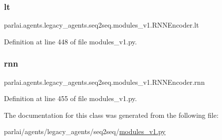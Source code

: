 \subsubsection{\texorpdfstring{lt}{lt}}
{\footnotesize\ttfamily parlai.\+agents.\+legacy\+\_\+agents.\+seq2seq.\+modules\+\_\+v1.\+R\+N\+N\+Encoder.\+lt}



Definition at line 448 of file modules\+\_\+v1.\+py.

\mbox{\label{classparlai_1_1agents_1_1legacy__agents_1_1seq2seq_1_1modules__v1_1_1RNNEncoder_a7316b7df38ef0e139b65407ff201e7ba}} 
\subsubsection{\texorpdfstring{rnn}{rnn}}
{\footnotesize\ttfamily parlai.\+agents.\+legacy\+\_\+agents.\+seq2seq.\+modules\+\_\+v1.\+R\+N\+N\+Encoder.\+rnn}



Definition at line 455 of file modules\+\_\+v1.\+py.



The documentation for this class was generated from the following file\+:\begin{DoxyCompactItemize}
\item 
parlai/agents/legacy\+\_\+agents/seq2seq/\hyperlink{modules__v1_8py}{modules\+\_\+v1.\+py}\end{DoxyCompactItemize}
